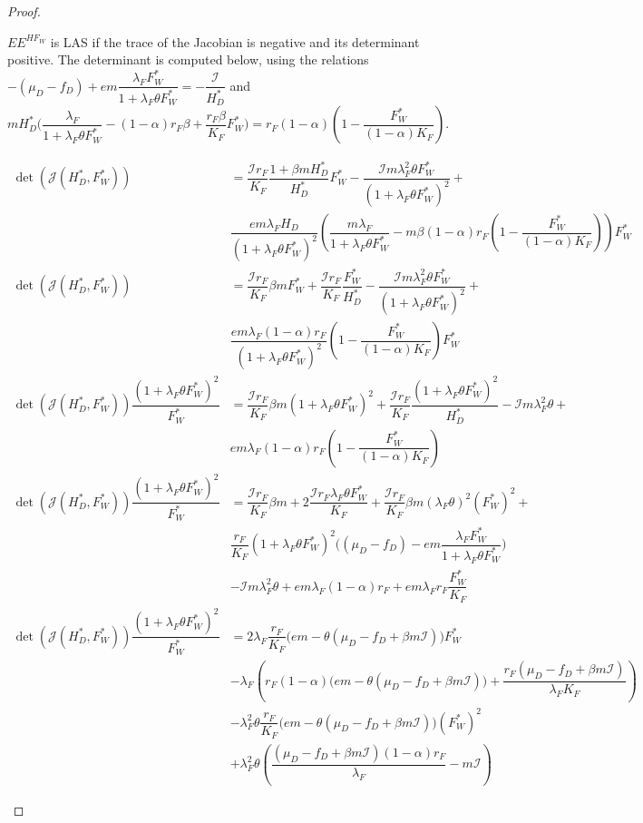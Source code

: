 \documentclass{article}
\newcommand{\lfw}{\lambda_{F}}
\newcommand{\lfw}{\lambda_{F}}
\newcommand{\cI}{\mathcal{I}}
\begin{document}
\begin{proof}
\begin{itemize}
$EE^{HF_W}$ is LAS if the trace of the Jacobian is negative and its determinant positive. The determinant is computed below, using the relations $-(\mu_D -f_D) +e m \dfrac{\lfw F_W^*}{1 + \lfw \theta F_W^*} = -\dfrac{\cI}{H_D^*}$ and $m H_D^*\Big(\dfrac{\lfw}{1 + \lfw \theta F_W^*} - (1-\alpha)r_F \beta + \dfrac{r_F \beta}{K_F}F_W^* \Big) = r_F(1-\alpha) \left(1- \dfrac{F_W^*}{(1-\alpha)K_F}\right)$.

\begin{align*}
\det(\mathcal{J}(H_D^*, F_W^*)) &= \dfrac{\cI r_F}{K_F} \dfrac{1 + \beta m H_D^*}{H_D^*}F_W^* - \dfrac{\cI m \lfw ^2 \theta F_W^*}{(1 + \lfw \theta F_W^*)^2} + \\ &\dfrac{e m \lfw H_D}{(1 + \lfw \theta F_W^*)^2} \left(\dfrac{m \lfw}{1 + \lfw \theta F_W^*} - m\beta (1-\alpha) r_F \left(1 -\dfrac{F_W^*}{(1-\alpha) K_F} \right) \right) F_W^* \\
\det(\mathcal{J}(H_D^*, F_W^*)) &= \dfrac{\cI r_F}{K_F} \beta m F_W^* +  \dfrac{\cI r_F}{K_F} \dfrac{F_W^*}{H_D^*} - \dfrac{\cI m \lfw ^2 \theta F_W^*}{(1 + \lfw \theta F_W^*)^2} + \\&  \dfrac{e m \lfw (1-\alpha) r_F}{(1 + \lfw \theta F_W^*)^2}  \left(1 -\dfrac{F_W^*}{(1-\alpha) K_F} \right)  F_W^* \\
\det(\mathcal{J}(H_D^*, F_W^*)) \dfrac{(1 + \lfw \theta F_W^*)^2}{F_W^*} &= \dfrac{\cI r_F}{K_F} \beta m (1 + \lfw \theta F_W^*)^2  +  \dfrac{\cI r_F}{K_F} \dfrac{(1 + \lfw \theta F_W^*)^2}{H_D^*} - \cI m \lfw ^2 \theta  + \\ &e m \lfw (1-\alpha) r_F  \left(1 -\dfrac{F_W^*}{(1-\alpha) K_F} \right)  \\
\det(\mathcal{J}(H_D^*, F_W^*)) \dfrac{(1 + \lfw \theta F_W^*)^2}{F_W^*} &= \dfrac{\cI r_F}{K_F} \beta m  + 2 \dfrac{\cI r_F \lfw \theta F_W^*}{K_F} + \dfrac{\cI r_F}{K_F} \beta m (\lfw \theta)^2 (F_W^*)^2  + \\ & \dfrac{r_F}{K_F} (1 + \lfw \theta F_W^*)^2 \Big((\mu_D -f_D) -e m \dfrac{\lfw F_W^*}{1 + \lfw \theta F_W^*}\Big)  \\ &- \cI m \lfw ^2 \theta  + e m \lfw (1-\alpha) r_F +  e m \lfw r_F \dfrac{F_W^*}{ K_F}   \\
\det(\mathcal{J}(H_D^*, F_W^*)) \dfrac{(1 + \lfw \theta F_W^*)^2}{F_W^*} &=  2\lfw \dfrac{r_F}{K_F} \Big(em - \theta(\mu_D-f_D + \beta m \cI) \Big) F_W^*  \\& -\lfw \left(r_F (1-\alpha)   \Big(em - \theta(\mu_D-f_D + \beta m \cI)  \Big) + \dfrac{r_F(\mu_D-f_D + \beta m \cI)}{\lfw K_F} \right) \\ & - \lfw^2 \theta \dfrac{r_F}{K_F} \Big(em - \theta(\mu_D-f_D + \beta m \cI) \Big) (F_W^*)^2 \\&
+ \lfw^2 \theta \left(\dfrac{(\mu_D - f_D + \beta m \cI)(1-\alpha) r_F}{\lfw} - m\cI\right)
\end{align*}








\end{itemize}
\end{proof}
\end{document}
